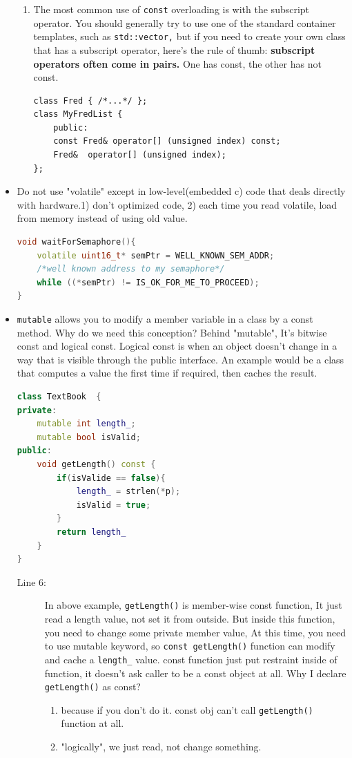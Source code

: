 \documentclass[a4paper,11pt,twoside]{book}
\begin{document}
\begin{itemize}
\begin{enumerate}
		\item The most common use of \texttt{const} overloading is with the subscript operator. You should generally try to use one of the standard container templates, such as \texttt{std::vector,} but if you need to create your own class that has a subscript operator, here's the rule of thumb:\textbf{ subscript operators often come in pairs.} One has const, the other has not const. 
\begin{lstlisting}[numbers=none]
class Fred { /*...*/ };
class MyFredList {
	public:
	const Fred& operator[] (unsigned index) const;
	Fred&  operator[] (unsigned index);
};
\end{lstlisting}
		
	\end{enumerate}
	
	
	
	\item Do not use "volatile" except in low-level(embedded c) code that deals directly with hardware.1) don't optimized code, 2) each time you read volatile, load from memory instead of using old value.
\begin{lstlisting}[frame=single, language=c++]
void waitForSemaphore(){
	volatile uint16_t* semPtr = WELL_KNOWN_SEM_ADDR;
	/*well known address to my semaphore*/
	while ((*semPtr) != IS_OK_FOR_ME_TO_PROCEED);
}
\end{lstlisting}
	
	\item \texttt{mutable} allows you to modify a member variable in a class by a const method. Why do we need this conception? Behind "mutable", It's bitwise const and logical const. Logical const is when an object doesn't change in a way that is visible through the public interface. An example would be a class that computes a value the first time if required, then caches the result.
\begin{lstlisting}[frame=single, language=c++]
class TextBook  {
private:
	mutable int length_;
	mutable bool isValid;
public:
	void getLength() const {
		if(isValide == false){
			length_ = strlen(*p);
			isValid = true; 
		}
		return length_
	}
}
\end{lstlisting}
	\begin{description}
		\item[Line 6:] In above example, \texttt{getLength()} is member-wise const function, It just read a length value, not set it from outside. But inside this function, you need to change some private member value, At this time, you need to use mutable keyword, so \texttt{const getLength()} function can modify and cache a \texttt{length\_} value.  const function just put restraint inside of function, it doesn't ask caller to be a const object at all. Why I declare \texttt{getLength()} as const?
		\begin{enumerate}
			\item because if you don't do it. const obj can't call \texttt{getLength()} function at all. 
			\item "logically", we just read, not change something.
		\end{enumerate}
	\end{description}
	

\end{itemize}
\end{document}

